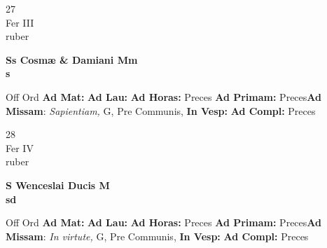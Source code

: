 \documentclass[10pt, openany]{book}
\begin{document}
    \begin{center}
        \begin{minipage}{3.5in}
            \vspace{2em}
            \begin{minipage}{0.5in}
                {\Huge 27} \\
                {\normalsize Fer III} \\
                {\normalsize ruber}
            \end{minipage}
            \begin{minipage}{3.0in}
                \textbf{ \large Ss Cosmæ \& Damiani Mm \\
                \textnormal{\normalsize s}} \\ 
            \end{minipage}
            \begin{justify}Off Ord
                \textbf{Ad Mat: }
                \textbf{Ad Lau: }
                \textbf{Ad Horas: }Preces
                \textbf{Ad Primam: }Preces\textbf{Ad Missam}: \textit{Sapientiam,} G, Pre Communis,  
                \textbf{In Vesp: }
                \textbf{Ad Compl: }Preces
            \end{justify}
        \end{minipage}
    \end{center}

    \begin{center}
        \begin{minipage}{3.5in}
            \vspace{2em}
            \begin{minipage}{0.5in}
                {\Huge 28} \\
                {\normalsize Fer IV} \\
                {\normalsize ruber}
            \end{minipage}
            \begin{minipage}{3.0in}
                \textbf{ \large S Wenceslai Ducis M \\
                \textnormal{\normalsize sd}} \\ 
            \end{minipage}
            \begin{justify}Off Ord
                \textbf{Ad Mat: }
                \textbf{Ad Lau: }
                \textbf{Ad Horas: }Preces
                \textbf{Ad Primam: }Preces\textbf{Ad Missam}: \textit{In virtute,} G, Pre Communis,  
                \textbf{In Vesp: }
                \textbf{Ad Compl: }Preces
            \end{justify}
        \end{minipage}
    \end{center}
\end{document}
